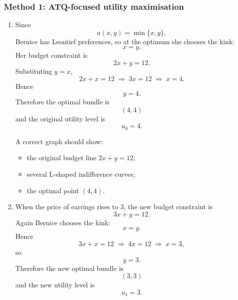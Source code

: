 \documentclass[12pt]{article}
\begin{document}
\subsubsection{Method 1: ATQ-focused utility maximisation}
\begin{enumerate}[label=(\alph*)]
    \item
    Since
    \[
    u(x,y)=\min\{x,y\},
    \]
    Bernice has Leontief preferences, so at the optimum she chooses the kink:
    \[
    x=y.
    \]
    Her budget constraint is
    \[
    2x+y=12.
    \]
    Substituting \(y=x\),
    \[
    2x+x=12
    \;\Longrightarrow\;
    3x=12
    \;\Longrightarrow\;
    x=4.
    \]
    Hence
    \[
    y=4.
    \]
    Therefore the optimal bundle is
    \[
    \boxed{(4,4)}
    \]
    and the original utility level is
    \[
    \boxed{u_0=4.}
    \]

    A correct graph should show:
    \begin{itemize}[leftmargin=*]
        \item the original budget line \(2x+y=12\);
        \item several L-shaped indifference curves;
        \item the optimal point \((4,4)\).
    \end{itemize}

    \begin{center}
    \end{center}

    \item
    When the price of earrings rises to \(3\), the new budget constraint is
    \[
    3x+y=12.
    \]
    Again Bernice chooses the kink:
    \[
    x=y.
    \]
    Hence
    \[
    3x+x=12
    \;\Longrightarrow\;
    4x=12
    \;\Longrightarrow\;
    x=3,
    \]
    so
    \[
    y=3.
    \]
    Therefore the new optimal bundle is
    \[
    \boxed{(3,3)}
    \]
    and the new utility level is
    \[
    \boxed{u_1=3.}
    \]


\end{enumerate}
\end{document}
